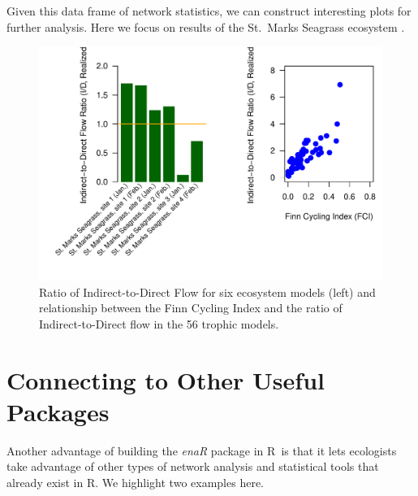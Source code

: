 \documentclass[11pt]{article}
\def\R{\textsf{R}}
\begin{document}
Given this data frame of network statistics, we can construct
interesting plots for further analysis. Here we focus on results of
the St.\ Marks Seagrass ecosystem \citep{baird98}.


\begin{Schunk}
\end{Schunk}


\begin{figure}
  \center
\includegraphics{enaR-048}
\caption{Ratio of Indirect-to-Direct Flow for six ecosystem models
  (left) and relationship between the Finn Cycling Index and the ratio
  of Indirect-to-Direct flow in the 56 trophic models.} \label{fig:aec}
\end{figure}


\section{Connecting to Other Useful Packages}
Another advantage of building the \textit{enaR} package in \R\ is that
it lets ecologists take advantage of other types of network analysis
and statistical tools that already exist in \R.  We highlight two
examples here.
\end{document}
